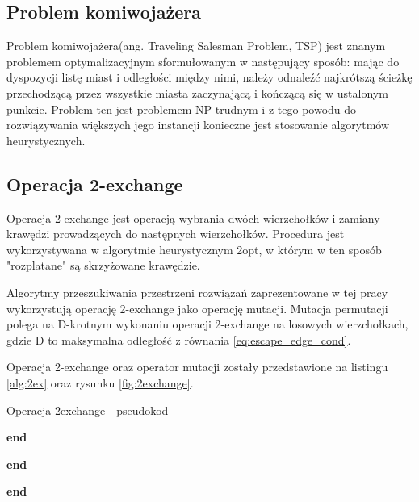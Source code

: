 \subsection{Problem komiwojażera}
Problem komiwojażera(ang. Traveling Salesman Problem, TSP) jest znanym problemem optymalizacyjnym
sformułowanym w następujący sposób: mając do dyspozycji listę miast i odległości między nimi, należy odnaleźć
najkrótszą ścieżkę przechodzącą przez wszystkie miasta zaczynającą i kończącą się w ustalonym punkcie.
Problem ten jest problemem NP-trudnym i z tego powodu do rozwiązywania większych jego instancji konieczne
jest stosowanie algorytmów heurystycznych.
\subsection{Operacja 2-exchange}
Operacja 2-exchange jest operacją wybrania dwóch wierzchołków i zamiany krawędzi prowadzących do następnych wierzchołków.
Procedura jest wykorzystywana w algorytmie heurystycznym 2opt, w którym w ten sposób "rozplatane" są skrzyżowane krawędzie.

Algorytmy przeszukiwania przestrzeni rozwiązań zaprezentowane w tej pracy wykorzystują operację 2-exchange jako operację mutacji.
Mutacja permutacji polega na D-krotnym wykonaniu operacji 2-exchange na losowych wierzchołkach, gdzie D to maksymalna odległość
z równania \ref{eq:escape_edge_cond}.

Operacja 2-exchange oraz operator mutacji zostały przedstawione na listingu \ref{alg:2ex} oraz rysunku \ref{fig:2exchange}.

\begin{algorithm}[h!]
      \caption{Operacja 2exchange - pseudokod}\label{alg:2ex}


      \textbf{end}

      \vspace{0.5em}


      \textbf{end}

      \vspace{0.5em}

      \textbf{end}

\end{algorithm}

